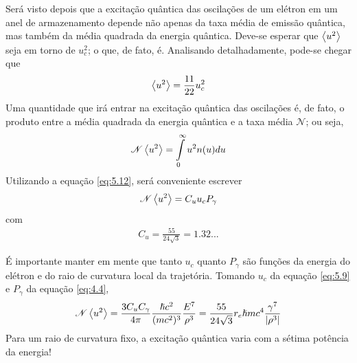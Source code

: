 Será visto depois que a excitação quântica das oscilações de um elétron em um anel de armazenamento depende não apenas da taxa média de emissão quântica, mas também da média quadrada da energia quântica. Deve-se esperar que $\left< u^2 \right>$ seja em torno de $u_c^2$; o que, de fato, é. Analisando detalhadamente, pode-se chegar que
\begin{align}
	\left< u^2 \right> = \frac{11}{22}u_c^2
\end{align}
Uma quantidade que irá entrar na excitação quântica das oscilações é, de fato, o produto entre a média quadrada da energia quântica e a taxa média $\mathscr{N}$; ou seja,
\begin{align}
	\mathscr{N}\left< u^2 \right> = \int\limits_{0}^{\infty}u^2n(u)du\label{eq:5.17}
\end{align}
Utilizando a equação \eqref{eq:5.12}, será conveniente escrever
\begin{align}
	\mathscr{N}\left< u^2 \right> = C_u u_c P_\gamma\label{eq:5.18}
\end{align}
com
\begin{align}
	C_u = \frac{55}{24\sqrt{3}} = 1.32...
\end{align}

É importante manter em mente que tanto $u_c$ quanto $P_\gamma$ são funções da energia do elétron e do raio de curvatura local da trajetória. Tomando $u_c$ da equação \eqref{eq:5.9} e $P_\gamma$ da equação \eqref{eq:4.4},
\begin{align}
	\mathscr{N}\left< u^2 \right> = \frac{3C_u C_\gamma}{4\pi}\frac{\hslash c^2}{(mc^2)^3}\frac{E^7}{\rho^3} = \frac{55}{24\sqrt{3}}r_e \hslash mc^4 \frac{\gamma^7}{|\rho^3|}
\end{align}
Para um raio de curvatura fixo, a excitação quântica varia com a sétima potência da energia!